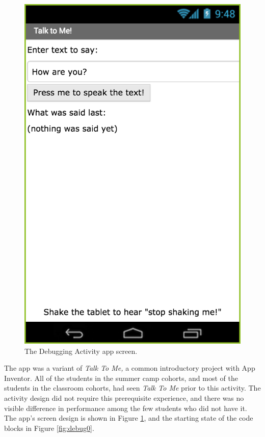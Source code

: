 \begin{figure}
  \centering
      \includegraphics{images/debugActivity/debug-screen}
  \caption[The Debugging Activity app screen]{The Debugging Activity app screen.}
  \label{fig:debug-screen}
\end{figure}

The app was a variant of \emph{Talk To Me,} a common introductory project with App Inventor. All of the students in the summer camp cohorts, and most of the students in the classroom cohorts, had seen \emph{Talk To Me} prior to this activity. The activity design did not require this prerequisite experience, and there was no visible difference in performance among the few students who did not have it. The app's screen design is shown in Figure \ref{fig:debug-screen}, and the starting state of the code blocks in Figure \ref{fig:debug0}.

